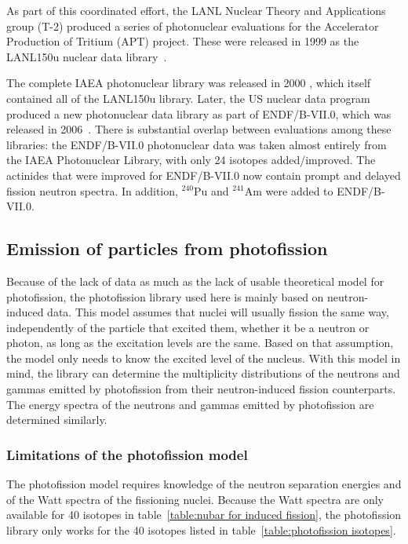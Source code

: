 As part of this coordinated effort, the LANL Nuclear Theory and Applications group (T-2) produced a series of photonuclear evaluations for the Accelerator Production of Tritium (APT) project. These were released in 1999 as the LANL150u nuclear data library~\cite{Chadwick 1999}.  

The complete IAEA photonuclear library was released in 2000 \cite{IAEAphoto}, which itself contained all of the LANL150u library. 
Later, the US nuclear data program produced a new photonuclear data library as part of ENDF/B-VII.0, which was released in 2006~\cite{ENDFB7}. 
There is substantial overlap between evaluations among these libraries: the ENDF/B-VII.0 photonuclear data was taken almost entirely from the IAEA Photonuclear Library, with only 24 isotopes added/improved. The actinides that were improved for ENDF/B-VII.0 now contain prompt and delayed fission neutron spectra.  In addition, $^{240}$Pu and $^{241}$Am were added to ENDF/B-VII.0.  

\subsection{Emission of particles from photofission}

Because of the lack of data as much as the lack of usable 
theoretical model for photofission, the photofission library
used here is mainly based on neutron-induced data. This model
assumes that nuclei will usually fission the same way, independently of the
particle that excited them, whether it be a neutron or photon, 
as long as the excitation levels are the same. Based on that 
assumption, the model only needs to know the excited level of
the nucleus. With this model in mind, the library can 
determine the multiplicity distributions of the neutrons and 
gammas emitted by photofission from their neutron-induced 
fission counterparts. The energy spectra of the neutrons and 
gammas emitted by photofission are determined similarly.

\subsubsection*{Limitations of the photofission model}

The photofission model requires knowledge of the neutron separation energies and of the Watt spectra of the fissioning nuclei. Because the Watt spectra are only available for 40 isotopes in table~\ref{table:nubar for induced fission}, the photofission library only works for the 40 isotopes listed in table~\ref{table:photofission isotopes}.

